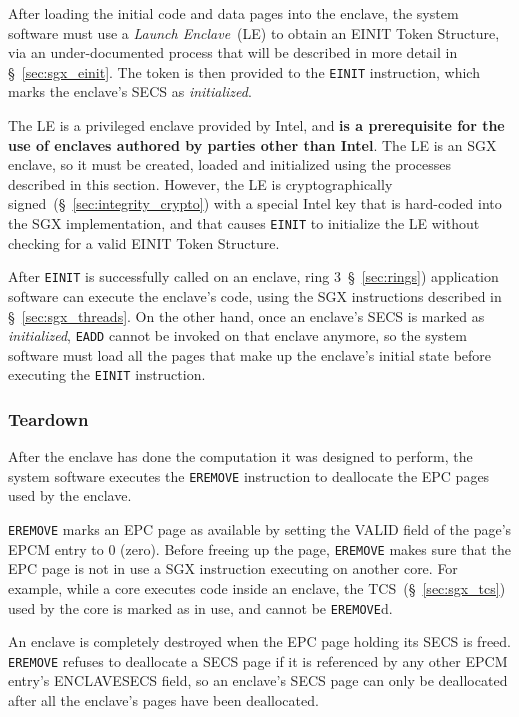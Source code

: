 
After loading the initial code and data pages into the enclave, the system
software must use a \textit{Launch Enclave}~(LE) to obtain an EINIT Token
Structure, via an under-documented process that will be described in more
detail in \S~\ref{sec:sgx_einit}. The token is then provided to the
\texttt{EINIT} instruction, which marks the enclave's SECS as
\textit{initialized}.

The LE is a privileged enclave provided by Intel, and \textbf{is a prerequisite
for the use of enclaves authored by parties other than Intel}. The LE is an
SGX enclave, so it must be created, loaded and initialized using the processes
described in this section. However, the LE is cryptographically
signed~(\S~\ref{sec:integrity_crypto}) with a special Intel key that is
hard-coded into the SGX implementation, and that causes \texttt{EINIT} to
initialize the LE  without checking for a valid EINIT Token Structure.

After \texttt{EINIT} is successfully called on an enclave,
ring 3~\S~\ref{sec:rings}) application software can execute the enclave's code,
using the SGX instructions described in \S~\ref{sec:sgx_threads}. On the other
hand, once an enclave's SECS is marked as \textit{initialized}, \texttt{EADD}
cannot be invoked on that enclave anymore, so the system software must load all
the pages that make up the enclave's initial state before executing the
\texttt{EINIT} instruction.


\subsubsection{Teardown}
\label{sec:sgx_eremove}

After the enclave has done the computation it was designed to perform, the
system software executes the \texttt{EREMOVE} instruction to deallocate the
EPC pages used by the enclave.

\texttt{EREMOVE} marks an EPC page as available by setting the VALID field of
the page's EPCM entry to 0 (zero). Before freeing up the page, \texttt{EREMOVE}
makes sure that the EPC page is not in use a SGX instruction executing on
another core. For example, while a core executes code inside an enclave, the
TCS~(\S~\ref{sec:sgx_tcs}) used by the core is marked as in use, and cannot be
\texttt{EREMOVE}d.

An enclave is completely destroyed when the EPC page holding its SECS is freed.
\texttt{EREMOVE} refuses to deallocate a SECS page if it is referenced by any
other EPCM entry's ENCLAVESECS field, so an enclave's SECS page can only be
deallocated after all the enclave's pages have been deallocated.
